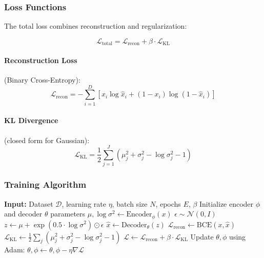 \documentclass[conference]{IEEEtran}
\begin{document}
\subsubsection{Loss Functions}

The total loss combines reconstruction and regularization:

\begin{equation}
\mathcal{L}_{\text{total}} = \mathcal{L}_{\text{recon}} + \beta \cdot \mathcal{L}_{\text{KL}}
\end{equation}

\paragraph{Reconstruction Loss} (Binary Cross-Entropy):
\begin{equation}
\mathcal{L}_{\text{recon}} = -\sum_{i=1}^{D} \left[ x_i \log \hat{x}_i + (1 - x_i) \log (1 - \hat{x}_i) \right]
\end{equation}

\paragraph{KL Divergence} (closed form for Gaussian):
\begin{equation}
\mathcal{L}_{\text{KL}} = \frac{1}{2} \sum_{j=1}^{J} \left( \mu_j^2 + \sigma_j^2 - \log \sigma_j^2 - 1 \right)
\end{equation}

\subsubsection{Training Algorithm}

\begin{algorithm}[H]
\caption{VAE Training}
\begin{algorithmic}[1]
\State \textbf{Input:} Dataset $\mathcal{D}$, learning rate $\eta$, batch size $N$, epochs $E$, $\beta$
\State Initialize encoder $\phi$ and decoder $\theta$ parameters
        \State $\mu, \log\sigma^2 \leftarrow \text{Encoder}_\phi(x)$
        \State $\epsilon \sim \mathcal{N}(0, I)$
        \State $z \leftarrow \mu + \exp(0.5 \cdot \log\sigma^2) \odot \epsilon$
        \State $\hat{x} \leftarrow \text{Decoder}_\theta(z)$
        \State $\mathcal{L}_{\text{recon}} \leftarrow \text{BCE}(x, \hat{x})$
        \State $\mathcal{L}_{\text{KL}} \leftarrow \frac{1}{2} \sum_j (\mu_j^2 + \sigma_j^2 - \log\sigma_j^2 - 1)$
        \State $\mathcal{L} \leftarrow \mathcal{L}_{\text{recon}} + \beta \cdot \mathcal{L}_{\text{KL}}$
        \State Update $\theta, \phi$ using Adam: $\theta, \phi \leftarrow \theta, \phi - \eta \nabla \mathcal{L}$
    \EndFor
\EndFor
\end{algorithmic}
\end{algorithm}
\end{document}
